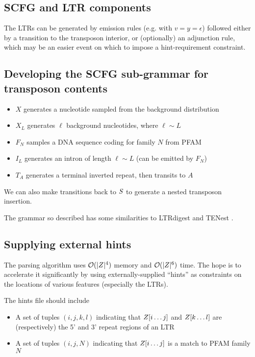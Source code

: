 \documentclass[10pt]{article}
\begin{document}
\subsection{SCFG and LTR components}

The LTRs can be generated by emission rules (e.g. with $v=y=\epsilon$) followed either by a transition to the transposon interior,
or (optionally) an adjunction rule, which may be an easier event on which to impose a hint-requirement constraint.

\subsection{Developing the SCFG sub-grammar for transposon contents}

\begin{itemize}
\item $X$ generates a nucleotide sampled from the background distribution
\item $X_L$ generates $\ell$ background nucleotides, where $\ell \sim L$
\item $F_N$ samples a DNA sequence coding for family $N$ from PFAM \cite{Pfam2008}
\item $I_L$ generates an intron of length $\ell \sim L$ (can be emitted by $F_N$)
\item $T_A$ generates a terminal inverted repeat, then transits to $A$
\end{itemize}
We can also make transitions back to $S$ to generate a nested transposon insertion.

The grammar so described has some similarities to LTRdigest \cite{pmid19786494} and TENest \cite{KronmillerWise2008}.


\subsection{Supplying external hints}

The parsing algorithm uses ${\cal O}(|Z|^4)$ memory and ${\cal O}(|Z|^6)$ time.
The hope is to accelerate it significantly by using externally-supplied ``hints''
as constraints on the locations of various features (especially the LTRs).

The hints file should include
\begin{itemize}
\item A set of tuples $(i,j,k,l)$ indicating that $Z[i \ldots j]$ and $Z[k \ldots l]$ are (respectively) the 5' and 3' repeat regions of an LTR
\item A set of tuples $(i,j,N)$ indicating that $Z[i \ldots j]$ is a match to PFAM family $N$
\end{itemize}
\end{document}

